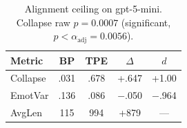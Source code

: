 \begin{table}[t]
\centering
\small
\begin{tabular}{lcccc}
\toprule
\textbf{Metric} & \textbf{BP} & \textbf{TPE} & \textbf{$\Delta$} & \textbf{$d$} \\
\midrule
Collapse & .031 & .678 & +.647 & +1.00 \\
EmotVar & .136 & .086 & $-$.050 & $-$.964 \\
AvgLen & 115 & 994 & +879 & --- \\
\bottomrule
\end{tabular}
\caption{Alignment ceiling on gpt-5-mini. Collapse raw $p = 0.0007$ (significant, $p < \alpha_\text{adj} = 0.0056$).}
\label{tab:gpt5}
\end{table}

